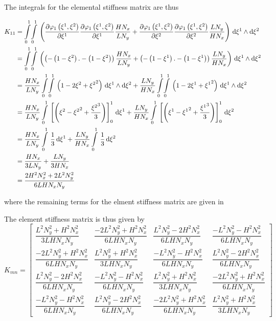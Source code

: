 The integrals for the elemental stiffness matrix are thus

\begin{equation}
  \begin{aligned}
    K_{11}&=\giint{0}{1}{0}{1}{\pbrac{\delby{\lbfn{1}{\xione,\xitwo}}{\xione}\delby{\lbfn{1}{\xione,\xitwo}}{\xione}
        \dfrac{H N_{x}}{L N_{y}}+\delby{\lbfn{1}{\xione,\xitwo}}{\xitwo}\delby{\lbfn{1}{\xione,\xitwo}}{\xitwo}
        \dfrac{L N_{y}}{H N_{x}}}}{\xione}{\xitwo}\\
    &=\giint{0}{1}{0}{1}{\pbrac{\pbrac{-\pbrac{1-\xitwo}.-\pbrac{1-\xitwo}}\dfrac{H N_{x}}{L N_{y}}+
    \pbrac{-\pbrac{1-\xione}.-\pbrac{1-\xione}}\dfrac{L N_{y}}{H N_{x}}}}{\xione}{\xitwo} \\
    &=\dfrac{H N_{x}}{L N_{y}}\giint{0}{1}{0}{1}{\pbrac{1-2\xitwo+\xitwosq}}{\xione}{\xitwo}+
    \dfrac{L N_{y}}{H N_{x}}\giint{0}{1}{0}{1}{\pbrac{1-2\xione+\xionesq}}{\xione}{\xitwo} \\
    &=\dfrac{H N_{x}}{L N_{y}}\gint{0}{1}{\sqbrac{\pbrac{\xitwo-\xitwosq+\dfrac{\xitwocube}{3}}}_{0}^{1}}{\xione}+
    \dfrac{L N_{y}}{H N_{x}}\gint{0}{1}{\sqbrac{\pbrac{\xione-\xionesq+\dfrac{\xionecube}{3}}}_{0}^{1}}{\xitwo} \\
    &=\dfrac{H N_{x}}{L N_{y}}\gint{0}{1}{\dfrac{1}{3}}{\xione}+\dfrac{L N_{y}}{H N_{x}}\gint{0}{1}{\dfrac{1}{3}}{\xitwo} \\
    &=\dfrac{H N_{x}}{3 L N_{y}}+\dfrac{L N_{y}}{3 H N_{x}} \\
    &=\dfrac{2 H^{2}N_{x}^{2}+2 L^{2}N_{y}^{2}}{6 L H N_{x} N_{y}}
  \end{aligned}
\end{equation}

where the remaining terms for the elment stiffness matrix are given in 

The element stiffness matrix is thus given by  \ie
\begin{equation}
  K_{mn}=\begin{bmatrix}
  \dfrac{L^{2}N_{y}^{2}+H^{2}N_{x}^{2}}{3 L H N_{x} N_{y}} & \dfrac{-2 L^{2}N_{y}^{2}+H^{2}N_{x}^{2}}{6 L H N_{x} N_{y}} &
  \dfrac{L^{2}N_{y}^{2}-2 H^{2}N_{x}^{2}}{6 L H N_{x} N_{y}} & \dfrac{-L^{2}N_{y}^{2}-H^{2}N_{x}^{2}}{6 L H N_{x} N_{y}} \\
  \dfrac{-2 L^{2}N_{y}^{2}+H^{2}N_{x}^{2}}{6 L H N_{x} N_{y}} & \dfrac{L^{2}N_{y}^{2}+H^{2}N_{x}^{2}}{3 L H N_{x} N_{y}} &
  \dfrac{-L^{2}N_{y}^{2}-H^{2}N_{x}^{2}}{6 L H N_{x} N_{y}} & \dfrac{L^{2}N_{y}^{2}-2 H^{2}N_{x}^{2}}{6 L H N_{x} N_{y}} \\
  \dfrac{L^{2}N_{y}^{2}-2 H^{2}N_{x}^{2}}{6 L H N_{x} N_{y}} & \dfrac{-L^{2}N_{y}^{2}-H^{2}N_{x}^{2}}{6 L H N_{x} N_{y}} &
  \dfrac{L^{2}N_{y}^{2}+H^{2}N_{x}^{2}}{3 L H N_{x} N_{y}} & \dfrac{-2 L^{2}N_{y}^{2}+H^{2}N_{x}^{2}}{6 L H N_{x} N_{y}} \\
  \dfrac{-L^{2}N_{y}^{2}-H^{2}N_{x}^{2}}{6 L H N_{x} N_{y}} & \dfrac{L^{2}N_{y}^{2}-2 H^{2}N_{x}^{2}}{6 L H N_{x} N_{y}} &
  \dfrac{-2 L^{2}N_{y}^{2}+H^{2}N_{x}^{2}}{6 L H N_{x} N_{y}} & \dfrac{L^{2}N_{y}^{2}+H^{2}N_{x}^{2}}{3 L H N_{x} N_{y}}
  \end{bmatrix}
\end{equation}


